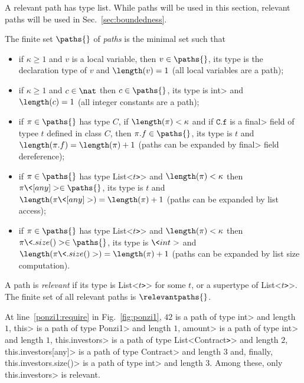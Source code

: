 A relevant path has type list. While paths will be used
in this section, relevant paths will be used in Sec.~\ref{sec:boundedness}.
%
\begin{definition}[Paths]\label{def:path}
  The finite set $\paths{}$ of \emph{paths} is the minimal set such that
  \begin{itemize}
  \item if $\kappa\ge 1$ and $v$ is a local variable,
    then $v\in\paths{}$, its type is the declaration type of $v$
    and $\length(v)=1$ (all local variables are a path);
  \item if $\kappa\ge 1$ and $c\in\nat$ then $c\in\paths{}$, its type is \<int>
    and $\length(c)=1$ (all integer constants are a path);
  \item if $\pi\in\paths{}$ has type $C$, if $\length(\pi)<\kappa$
    and if $\mathtt{C.f}$ is a \<final> field of typee $t$ defined in class $C$,
    then $\pi.f\in\paths{}$, its type is $t$ and $\length(\pi.f)=\length(\pi)+1$
    (paths can be expanded by \<final> field dereference);
  \item if $\pi\in\paths{}$ has type \<List<$t$\texttt{>}> and $\length(\pi)<\kappa$
    then $\pi\<[any]>\in\paths{}$, its type is $t$ and $\length(\pi\<[any]>)=\length(\pi)+1$
    (paths can be expanded by list access);
  \item if $\pi\in\paths{}$ has type \<List<$t$\texttt{>}> and $\length(\pi)<\kappa$
    then $\pi\<.size()>\in\paths{}$, its type is $\<int>$ and
    $\length(\pi\<.size()>)=\length(\pi)+1$
    (paths can be expanded by list size computation).
  \end{itemize}
  A path is \emph{relevant} if its type is \<List<$t$\texttt{>}> for some $t$,
  or a supertype of \<List<$t$\texttt{>}>.
  The finite set of all relevant paths is $\relevantpaths{}$.
\end{definition}
%
\begin{example}
  At line~\ref{ponzi1:require} in Fig.~\ref{fig:ponzi1},
  $42$ is a path of type \<int> and length $1$, \<this> is a path of type \<Ponzi1>
  and length $1$,
  \<amount> is a path of type \<int> and length $1$,
  \<this.investors> is a path of type \<List<Contract\texttt{>}> and length $2$,
  \<this.investors[any]> is a path of type \<Contract> and length $3$
  and, finally, \<this.investors.size()> is a path of type \<int> and length $3$.
  Among these, only \<this.investors> is relevant.
\end{example}

